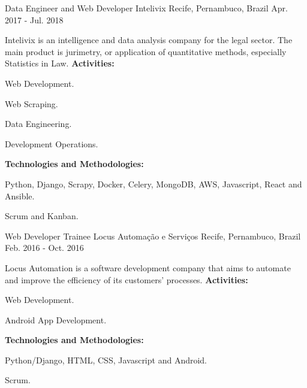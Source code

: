 \begin{cventries}
\cventry
{Data Engineer and Web Developer} %
{Intelivix} %
{Recife, Pernambuco, Brazil} %
{Apr. 2017 - Jul. 2018} %
{ %
Intelivix is an intelligence and data analysis company for the legal sector. The main product is
jurimetry, or application of quantitative methods, especially Statistics in Law. \vspace{1.5mm} \hfill \break
\textbf{Activities:} \hfill \break
\begin{cvitems}
\item {Web Development.}
\item {Web Scraping.}
\item {Data Engineering.}
\item {Development Operations.}
\end{cvitems} \vspace{1.5mm} \hfill \break
\textbf{Technologies and Methodologies:} \hfill \break
\begin{cvitems}
\item {Python, Django, Scrapy, Docker, Celery, MongoDB, AWS, Javascript, React and Ansible.}
\item {Scrum and Kanban.}
\end{cvitems}
}


\cventry
{Web Developer Trainee} %
{Locus Automação e Serviços} %
{Recife, Pernambuco, Brazil} %
{Feb. 2016 - Oct. 2016} %
{ %
Locus Automation is a software development company that aims to automate and improve the
efficiency of its customers' processes. \vspace{1.5mm} \hfill \break
\textbf{Activities:} \hfill \break
\begin{cvitems}
\item {Web Development.}
\item {Android App Development.}
\end{cvitems} \vspace{1.5mm} \hfill \break
\textbf{Technologies and Methodologies:} \hfill \break
\begin{cvitems}
\item {Python/Django, HTML, CSS, Javascript and Android.}
\item {Scrum.}
\end{cvitems}
}



\end{cventries}
